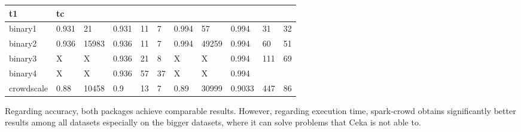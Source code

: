 \documentclass[letterpaper,10pt,english]{sphinxmanual}
\begin{document}
\begin{savenotes}
\begin{tabulary}{\linewidth}[t]{|T|T|T|T|T|T|T|T|T|T|T|}
t1
&\sphinxstyletheadfamily 
tc
\\
\hline
binary1
&
0.931
&
21
&
0.931
&
11
&
7
&
0.994
&
57
&
0.994
&
31
&
32
\\
\hline
binary2
&
0.936
&
15983
&
0.936
&
11
&
7
&
0.994
&
49259
&
0.994
&
60
&
51
\\
\hline
binary3
&
X
&
X
&
0.936
&
21
&
8
&
X
&
X
&
0.994
&
111
&
69
\\
\hline
binary4
&
X
&
X
&
0.936
&
57
&
37
&
X
&
X
&
0.994
&&\\
\hline
crowdscale
&
0.88
&
10458
&
0.9
&
13
&
7
&
0.89
&
30999
&
0.9033
&
447
&
86
\\
\hline
\end{tabulary}
\par
\sphinxattableend\end{savenotes}

Regarding accuracy, both packages achieve comparable results. However, regarding execution time, spark-crowd obtains
significantly better results among all datasets especially on the bigger datasets, where it can solve problems that
Ceka is not able to. 

%
%
\end{document}
